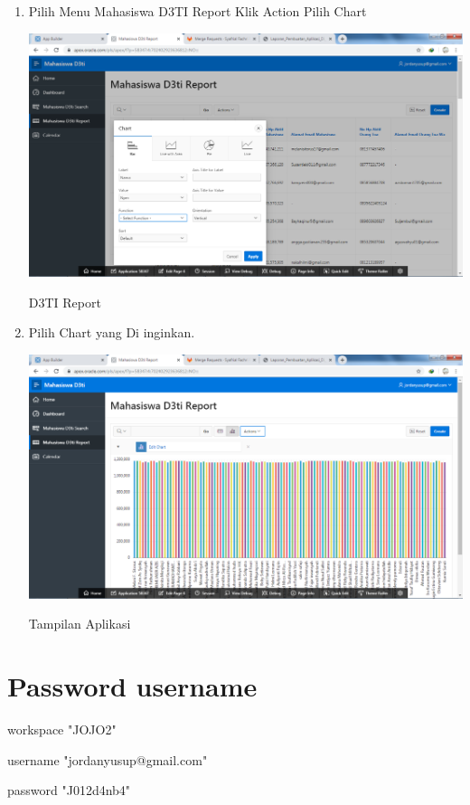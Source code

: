 \documentclass{article}
\begin{document}
\begin{enumerate}
    \item Pilih Menu Mahasiswa D3TI Report Klik Action Pilih Chart
    \begin{center}
         \centering
            \includegraphics[scale=0.27]{figures/DB7.png}
        \caption{D3TI Report}
        \label{excel}
    \end{center}
    
    \item Pilih Chart yang Di inginkan.
    \begin{center}
         \centering
            \includegraphics[scale=0.27]{figures/DB8.png}
        \caption{Tampilan Aplikasi}
        \label{excel}
    \end{center}            
       
\end{enumerate}



\section{Password username}
          \item workspace "JOJO2"
          
          \item username "jordanyusup@gmail.com"
          
          \item password "J012d4nb4"
      
      
       
\end{document}
